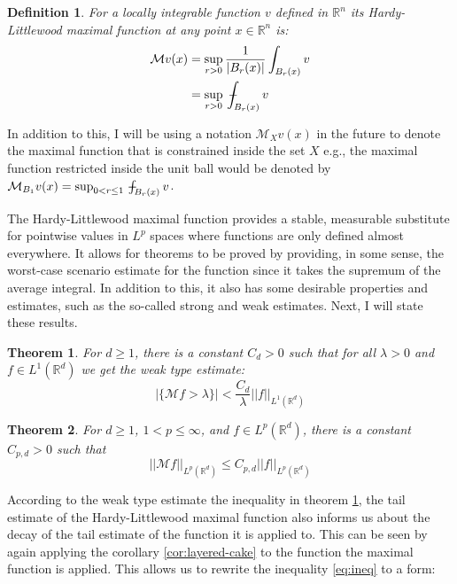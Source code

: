 \documentclass[12pt]{artikel1}
\newtheorem{theorem}{Theorem}[section]
\newtheorem{definition}{Definition}[section]
\begin{document}
\begin{definition}\label{def:HLM}
    For a locally integrable function $v$ defined in $\mathbb{R}^n$ its Hardy-Littlewood maximal function at any point $x\in\mathbb{R}^n$ is:
    \begin{align*}
        \mathcal{M}v(x)&=\sup_{r>0}\frac{1}{|B_r(x)|}\int_{B_r(x)}v \\
        &=\sup_{r>0}\intavg_{B_r(x)}v
    \end{align*}
\end{definition}

In addition to this, I will be using a notation $\mathcal{M}_Xv(x)$ in the future to denote the maximal function that is constrained inside the set $X$ e.g., the maximal function restricted inside the unit ball would be denoted by $\mathcal{M}_{B_1}v(x)=\sup_{0< r\leq1}\intavg_{B_r(x)}v$.

The Hardy-Littlewood maximal function provides a stable, measurable substitute for pointwise values in $L^p$ spaces where functions are only defined almost everywhere. It allows for theorems to be proved by providing, in some sense, the worst-case scenario estimate for the function since it takes the supremum of the average integral. In addition to this, it also has some desirable properties and estimates, such as the so-called strong and weak estimates. Next, I will state these results.

\begin{theorem}\label{thm:weak}
    For $d\geq1$, there is a constant $C_d>0$ such that for all $\lambda>0$ and $f\in L^1(\mathbb{R}^d)$ we get the weak type estimate:
    \begin{equation*}
        |\{\mathcal{M}f>\lambda\}|<\frac{C_d}{\lambda}||f||_{L^1(\mathbb{R}^d)}
    \end{equation*}
\end{theorem}

\begin{theorem}\label{thm:strong}
    For $d\geq1$, $1<p\leq\infty$, and $f\in L^p(\mathbb{R}^d)$, there is a constant $C_{p,d}>0$ such that
    \begin{equation*}
        ||\mathcal{M}f||_{L^p(\mathbb{R}^d)}\leq C_{p,d}||f||_{L^p(\mathbb{R}^d)}
    \end{equation*}
\end{theorem}

According to the weak type estimate the inequality in theorem \ref{thm:weak}, the tail estimate of the Hardy-Littlewood maximal function also informs us about the decay of the tail estimate of the function it is applied to. This can be seen by again applying the corollary \ref{cor:layered-cake} to the function the maximal function is applied. This allows us to rewrite the inequality \ref{eq:ineq} to a form:
\end{document}
